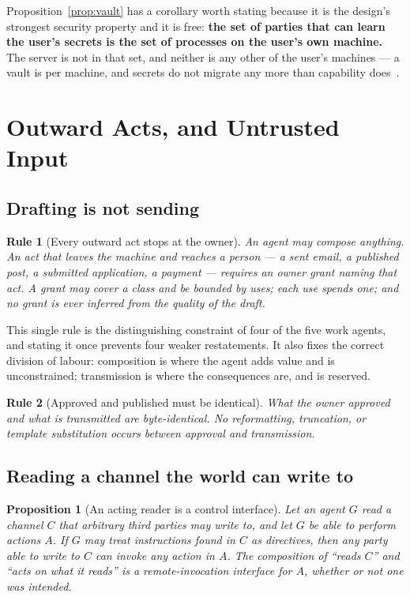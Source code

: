\documentclass[11pt]{article}
\newtheorem{drule}{Rule}
\newtheorem{proposition}{Proposition}
\begin{document}
Proposition~\ref{prop:vault} has a corollary worth stating because it is the design's strongest security property and it is free: \textbf{the set of parties that can learn the user's secrets is the set of processes on the user's own machine.} The server is not in that set, and neither is any other of the user's machines --- a vault is per machine, and secrets do not migrate any more than capability does~\citep{yang2026account}.

\section{Outward Acts, and Untrusted Input}
\label{sec:outward}

\subsection{Drafting is not sending}

\begin{drule}[Every outward act stops at the owner]
\label{rule:outward}
An agent may compose anything. An act that leaves the machine and reaches a person --- a sent email, a published post, a submitted application, a payment --- requires an owner grant naming \emph{that act}. A grant may cover a class and be bounded by uses; each use spends one; and no grant is ever inferred from the quality of the draft.
\end{drule}

This single rule is the distinguishing constraint of four of the five work agents, and stating it once prevents four weaker restatements. It also fixes the correct division of labour: composition is where the agent adds value and is unconstrained; transmission is where the consequences are, and is reserved.

\begin{drule}[Approved and published must be identical]
\label{rule:identical}
What the owner approved and what is transmitted are byte-identical. No reformatting, truncation, or template substitution occurs between approval and transmission.
\end{drule}

\subsection{Reading a channel the world can write to}

\begin{proposition}[An acting reader is a control interface]
\label{prop:untrusted}
Let an agent $G$ read a channel $C$ that arbitrary third parties may write to, and let $G$ be able to perform actions $A$. If $G$ may treat instructions found in $C$ as directives, then any party able to write to $C$ can invoke any action in $A$. The composition of ``reads $C$'' and ``acts on what it reads'' is a remote-invocation interface for $A$, whether or not one was intended.
\end{proposition}
\end{document}
